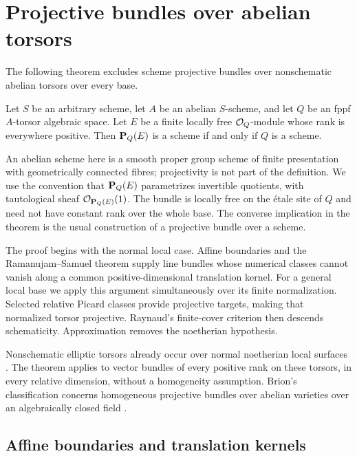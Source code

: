 \section{Projective bundles over abelian torsors}
\label{sec:torsor-projective-bundles}

The following theorem excludes scheme projective bundles over
nonschematic abelian torsors over every base.

\begin{theorem}\label{thm:torsor-projective-bundle}
Let $S$ be an arbitrary scheme, let $A$ be an abelian $S$-scheme,
and let $Q$ be an fppf $A$-torsor algebraic space. Let $E$ be a finite
locally free $\mathcal O_Q$-module whose rank is everywhere positive.
Then $\mathbf P_Q(E)$ is a scheme if and only if $Q$ is a scheme.
\end{theorem}

An abelian scheme here is a smooth proper group scheme of finite
presentation with geometrically connected fibres; projectivity is not part of
the definition. We use the convention that $\mathbf P_Q(E)$ parametrizes
invertible quotients, with tautological sheaf $\mathcal O_{\mathbf P_Q(E)}(1)$.
The bundle is locally free on the \'etale site of $Q$ and need not
have constant rank over the whole base. The converse implication
in the theorem is the usual construction of a projective bundle
over a scheme.

The proof begins with the normal local case. Affine boundaries and
the Ramanujam--Samuel theorem supply line bundles whose numerical
classes cannot vanish along a common positive-dimensional
translation kernel. For a general local base we apply this argument
simultaneously over its finite normalization. Selected relative
Picard classes provide projective targets, making that normalized
torsor projective. Raynaud's finite-cover criterion then descends
schematicity. Approximation removes the noetherian hypothesis.

Nonschematic elliptic torsors already occur over normal
noetherian local surfaces \cite[Theorem~2.1 and \S3]{Zomervrucht}.
The theorem applies to vector bundles of every positive rank on
these torsors, in every relative dimension, without a homogeneity
assumption. Brion's classification concerns homogeneous projective
bundles over abelian varieties over an algebraically closed field
\cite[pp.~2475--2479]{BrionProjective}.

\subsection{Affine boundaries and translation kernels}

